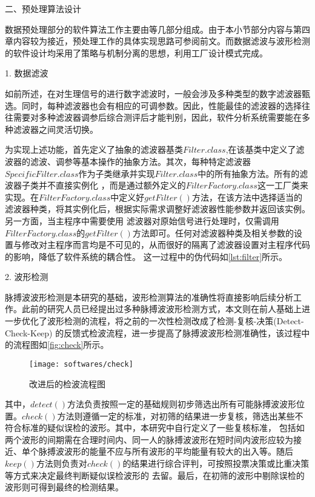二、预处理算法设计

数据预处理部分的软件算法工作主要由等几部分组成。由于本小节部分内容与第四章内容较为接近，预处理工作的具体实现思路可参阅前文。而数据滤波与波形检测的软件设计均采用了策略与机制分离的思想，利用工厂设计模式\cite{Enrich2018}完成。

1. 数据滤波

如前所述，在对生理信号的进行数字滤波时，一般会涉及多种类型的数字滤波器甄选。同时，每种滤波器也会有相应的可调参数。因此，性能最佳的滤波器的选择往往需要对多种滤波器调参后综合测评后才能判别，因此，软件分析系统需要能在多种滤波器之间灵活切换。

为实现上述功能，首先定义了抽象的滤波器基类$Filter.class$,在该基类中定义了滤波器的滤波、调参等基本操作的抽象方法。其次，每种特定滤波器$SpecificFilter.class$作为子类继承并实现$Filter.class$中的所有抽象方法。所有的滤波器子类并不直接实例化
，而是通过额外定义的$FilterFactory.class$这一工厂类来实现。在$FilterFactory.class$中定义好$getFilter()$方法，在该方法中选择适当的滤波器种类，将其实例化后，根据实际需求调整好滤波器性能参数并返回该实例。另一方面，当主程序中需要使用
滤波器对原始信号进行处理时，仅需调用$FilterFactory.class$的$getFilter()$方法即可。任何对滤波器种类及相关参数的设置与修改对主程序而言均是不可见的，从而很好的隔离了滤波器设置对主程序代码的影响，降低了软件系统的耦合性。
这一过程中的伪代码如\autoref{lst:filter}所示。


2. 波形检测

脉搏波波形检测是本研究的基础，波形检测算法的准确性将直接影响后续分析工作。此前的研究人员已经提出过多种脉搏波波形检测方式\cite{Wang2012}，本文则在前人基础上进一步优化了波形检测的流程，将之前的一次性检测改成了检测-复核-决策(Detect-Check-Keep)
的反馈式检波流程，进一步提高了脉搏波波形检测准确性，该过程中的流程图如\autoref{fig:check}所示。
\begin{figure}[htbp]
    \centering
    \texttt{[image: softwares/check]}
    \caption{\label{fig:check}改进后的检波流程图}
\end{figure}

其中，$detect()$方法负责按照一定的基础规则初步筛选出所有可能脉搏波波形位置。$check()$方法则遵循一定的标准，对初筛的结果进一步复核，筛选出某些不符合标准的疑似误检的波形。其中，本研究中自行定义了一些复核标准，
包括如两个波形的间期需在合理时间内、同一人的脉搏波波形在短时间内波形应较为接近、单个脉搏波波形的能量不应与所有波形的平均能量有较大的出入等。随后$keep()$方法则负责对$check()$的结果进行综合评判，可按照投票决策或比重决策等方式来决定最终判断疑似误检波形的
去留。最后，在初筛的波形中剔除误检的波形则可得到最终的检测结果。

